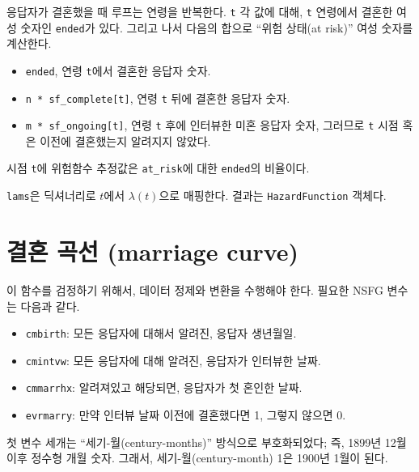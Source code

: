 응답자가 결혼했을 때 루프는 연령을 반복한다. 
{\tt t} 각 값에 대해, {\tt t} 연령에서 결혼한 여성 숫자인 {\tt ended}가 있다. 그리고 나서 다음의 합으로 ``위험 상태(at risk)'' 여성 숫자를 계산한다.

\begin{itemize}

\item {\tt ended}, 연령 {\tt t}에서 결혼한 응답자 숫자.

\item \verb"n * sf_complete[t]", 연령 {\tt t} 뒤에 결혼한 응답자 숫자.

\item \verb"m * sf_ongoing[t]", 연령 {\tt t} 후에 인터뷰한 미혼 응답자 숫자, 그러므로 {\tt t} 시점 혹은 이전에 결혼했는지 알려지지 않았다.

\end{itemize}

시점 {\tt t}에 위험함수 추정값은 \verb"at_risk"에 대한 {\tt ended}의 비율이다.

{\tt lams}은 딕셔너리로 $t$에서 $\lambda(t)$으로 매핑한다. 
결과는 {\tt HazardFunction} 객체다.


\section{결혼 곡선 (marriage curve)}

이 함수를 검정하기 위해서, 데이터 정제와 변환을 수행해야 한다.
필요한 NSFG 변수는 다음과 같다.


\begin{itemize}

\item {\tt cmbirth}: 모든 응답자에 대해서 알려진, 응답자 생년월일.

\item {\tt cmintvw}: 모든 응답자에 대해 알려진, 응답자가 인터뷰한 날짜.

\item {\tt cmmarrhx}: 알려져있고 해당되면, 응답자가 첫 혼인한 날짜.

\item {\tt evrmarry}: 만약 인터뷰 날짜 이전에 결혼했다면 1, 그렇지 않으면 0.

\end{itemize}

첫 변수 세개는 ``세기-월(century-months)'' 방식으로 부호화되었다; 즉, 1899년 12월 이후 정수형 개월 숫자. 그래서, 세기-월(century-month) 1은 1900년 1월이 된다.

